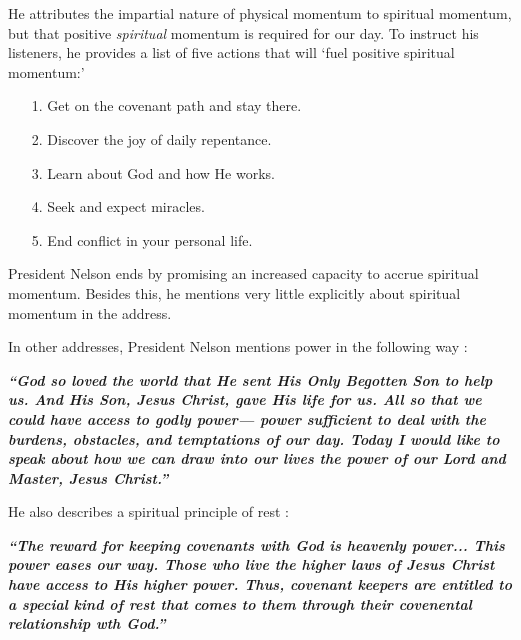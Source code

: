 \documentclass{article}
\begin{document}
            He attributes the impartial nature of physical momentum to spiritual momentum, but that positive \emph{spiritual} momentum is required for our day. 
            To instruct his listeners, he provides a list of five actions that will `fuel positive spiritual momentum:'

            \begin{enumerate}
                \item [1.] Get on the covenant path and stay there.
                \item [2.] Discover the joy of daily repentance.
                \item [3.] Learn about God and how He works.
                \item [4.] Seek and expect miracles.
                \item [5.] End conflict in your personal life.
            \end{enumerate}

            President Nelson ends by promising an increased capacity to accrue spiritual momentum. Besides this, he mentions very little explicitly about spiritual momentum in the address. 

            In other addresses, President Nelson mentions power in the following way \cite{Nelson2}: 

            \begin{center}
                \textbf{\textit{``God so loved the world that He sent His Only Begotten Son to help us. 
                And His Son, Jesus Christ, gave His life for us. 
                All so that we could have access to godly power— power sufficient to deal with the burdens, obstacles, and temptations of our day. 
                Today I would like to speak about how we can draw into our lives the power of our Lord and Master, Jesus Christ.''
                }}
            \end{center}

            He also describes a spiritual principle of rest \cite{Nelson3}: 

            \begin{center}
                \textbf{\textit{``The reward for keeping covenants with God is heavenly power... This power eases our way. Those who live the higher laws of Jesus Christ have access to His higher power.
                Thus, covenant keepers are entitled to a special kind of rest that comes to them through their covenental relationship wth God.''}}
            \end{center}
\end{document}
